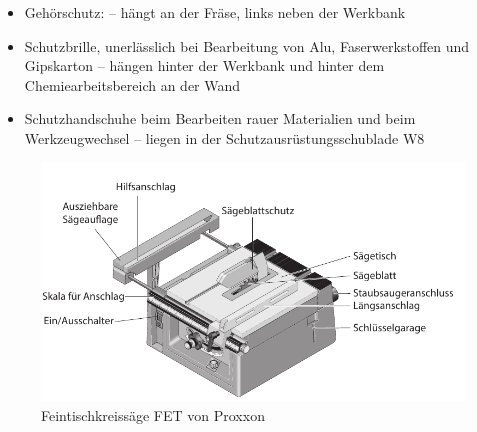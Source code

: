 \documentclass{\basedir/fablab-document}
\begin{document}
\begin{itemize}
\item Gehörschutz: -- hängt an der Fräse, links neben der Werkbank \\
\item Schutzbrille, unerlässlich bei Bearbeitung von Alu, Faserwerkstoffen und Gipskarton -- hängen hinter der Werkbank und hinter dem Chemiearbeitsbereich an der Wand \\
\item Schutzhandschuhe beim Bearbeiten rauer Materialien und beim Werkzeugwechsel -- liegen in der Schutzausrüstungsschublade W8\\
\end{itemize}

\begin{figure}[h!]
    \centering
    \includegraphics[width=\textwidth]{bilder/saege-sketch.pdf}
    \caption{Feintischkreissäge FET von Proxxon}
    \label{fig:sketch}
\end{figure}
\end{document}
